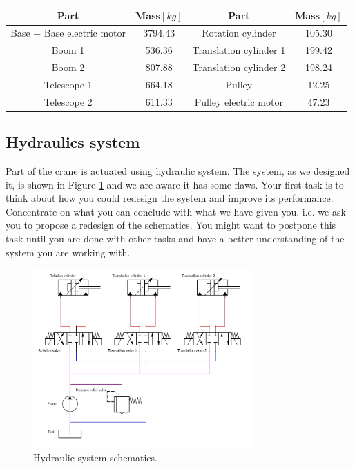 \documentclass{article}
\begin{document}
	\begin{center}
		\label{tab:crane_tab}
		\begin{tabular}{||c|| c || c|| c ||}
			\hline
			Part & Mass$[kg]$ & Part & Mass$[kg]$ \\
			\hline\hline
			Base + Base electric motor & 3794.43 & Rotation cylinder & 105.30\\ 
			\hline
			Boom 1 & 536.36 & Translation cylinder 1 & 199.42\\
			\hline
			Boom 2 & 807.88 & Translation cylinder 2 & 198.24\\
			\hline
			Telescope 1 & 664.18 & Pulley & 12.25\\
			\hline
			Telescope 2 & 611.33 & Pulley electric motor & 47.23\\
			\hline
		\end{tabular}
	\end{center}
	
	\subsection{Hydraulics system}
	
	Part of the crane is actuated using hydraulic system. The system, as we designed it, is shown in Figure \ref{fig:hydraulic} and we are aware it has some flaws. Your first task is to think about how you could redesign the system and improve its performance. Concentrate on what you can conclude with what we have given you, i.e. we ask you to propose a redesign of the schematics. You might want to postpone this task until you are done with other tasks and have a better understanding of the system you are working with.
	
	\begin{figure}[h!]
		\centering
		\includegraphics[width=0.75\textwidth]{hidraulika_shema.jpg}
		\caption{Hydraulic system schematics.}
		\label{fig:hydraulic}
	\end{figure}
	
\end{document}
